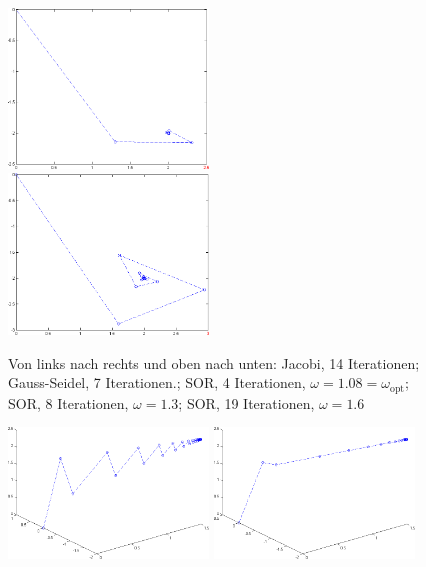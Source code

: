 \begin{refsection}
\begin{figure}
\includegraphics[width=0.475\textwidth]{sor/img/SOR_2D_8_It_w_1_3.png}\\[1mm]
\includegraphics[width=0.475\textwidth]{sor/img/SOR_2D_19_It_w_1_6.png}
\caption{Von links nach rechts und oben nach unten: Jacobi, 14 Iterationen;
Gauss-Seidel, 7 Iterationen.; SOR, 4 Iterationen, $\omega=1.08=\omega_{\text{opt}}$;
SOR, 8 Iterationen, $\omega=1.3$; SOR, 19 Iterationen, $\omega=1.6$}
\label{fig:SOR 2D Bsp2}
\end{figure}
\begin{figure}\centering
\includegraphics[width=0.475\textwidth]{sor/img/Jacobi_3D_46_It.png}\hfill
\includegraphics[width=0.475\textwidth]{sor/img/G_S_3D_23_It.png}\\[1mm]

\end{figure}
\end{refsection}
